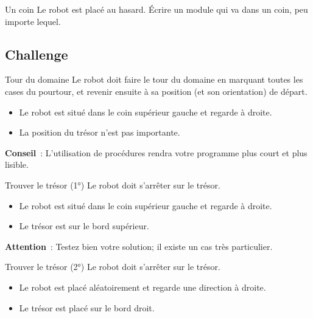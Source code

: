 		\begin{Exercice}{Un coin}
			Le robot est placé au hasard. 
			Écrire un module qui va dans un coin, peu
			importe lequel. 
		\end{Exercice}

	\subsection{Challenge}

		\begin{Exercice}{Tour du domaine}
			Le robot doit faire le tour du domaine en marquant toutes les cases du
			pourtour, et revenir ensuite à sa position (et son orientation) de
			départ.

			\begin{itemize}
			\item Le robot est situé dans le coin supérieur gauche et regarde à droite.
			\item La position du trésor n'est pas importante.
			\end{itemize}

			\textbf{Conseil}~: L'utilisation de procédures rendra
			votre programme plus court et plus lisible.
		\end{Exercice}

		\begin{Exercice}{Trouver le trésor (1°)}
			Le robot doit s'arrêter sur le trésor.

			\begin{itemize}
			\item Le robot est situé dans le coin supérieur gauche et regarde à droite.
			\item Le trésor est sur le bord supérieur.
			\end{itemize}

			\textbf{Attention}~: 
			Testez bien votre solution; il existe un cas très particulier.
		\end{Exercice}

		\begin{Exercice}{Trouver le trésor (2°)}
			Le robot doit s'arrêter sur le trésor.

			\begin{itemize}
			\item Le robot est placé aléatoirement et regarde une direction à droite.
			\item Le trésor est placé sur le bord droit.
			\end{itemize}
		\end{Exercice}

